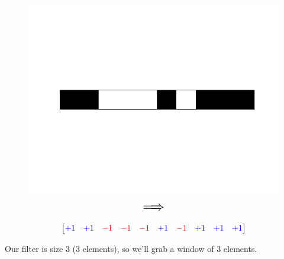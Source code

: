         \begin{figure}[ht]
            \begin{minipage}{.35\textwidth}
              \centering
              \includegraphics[width=.9\linewidth]{images/convolutional_neural_networks_images/1d_image.png} 
            \end{minipage}
            \begin{minipage}{.1\textwidth}
                \centering
                $$\mathlarger{\mathlarger{\mathlarger{\implies}}}$$
            \end{minipage}
            \begin{minipage}{.2\textwidth}
                \centering
              \[
              \begin{bmatrix}
                  \textcolor{blue}{+1}&\textcolor{blue}{+1}&\textcolor{red}{-1}&\textcolor{red}{-1}&\textcolor{red}{-1}&
                  \textcolor{blue}{+1}&\textcolor{red}{-1}&\textcolor{blue}{+1}&\textcolor{blue}{+1}&\textcolor{blue}{+1} \\
              \end{bmatrix}
              \]
            \end{minipage}
        \end{figure}

        Our filter is size 3 (3 elements), so we'll grab a window of 3 elements.


